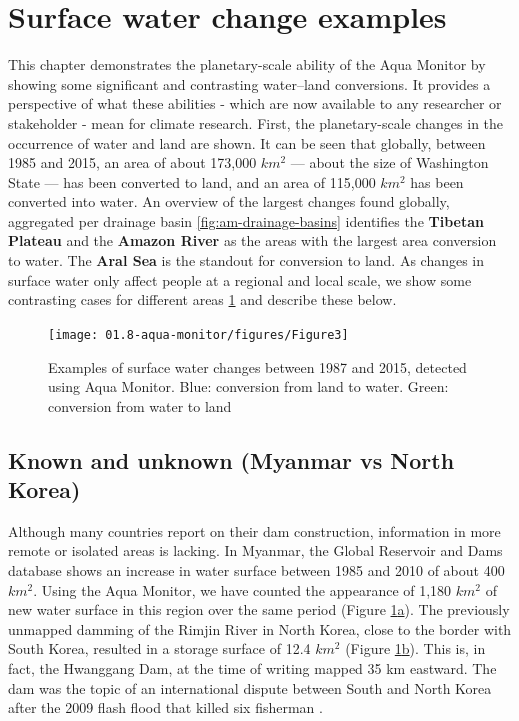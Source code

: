 \section{Surface water change examples}

This chapter demonstrates the planetary-scale ability of the Aqua Monitor by showing some significant and contrasting water–land conversions. It provides a perspective of what these abilities - which are now available to any researcher or stakeholder - mean for climate research. First, the planetary-scale changes in the occurrence of water and land are shown. It can be seen that globally, between 1985 and 2015, an area of about 173,000 $km^2$ — about the size of Washington State — has been converted to land, and an area of 115,000 $km^2$ has been converted into water. An overview of the largest changes found globally, aggregated per drainage basin \ref{fig:am-drainage-basins} identifies the \textbf{Tibetan Plateau} and the \textbf{Amazon River} as the areas with the largest area conversion to water. The \textbf{Aral Sea} is the standout for conversion to land. As changes in surface water only affect people at a regional and local scale, we show some contrasting cases for different areas \ref{fig:am-examples} and describe these below.

\begin{figure}[H]
	\centering
	\texttt{[image: 01.8-aqua-monitor/figures/Figure3]}
	\caption{Examples of surface water changes between 1987 and 2015, detected using Aqua Monitor. Blue: conversion from land to water. Green: conversion from water to land}
	\label{fig:am-examples}
\end{figure}

\subsection{Known and unknown (Myanmar vs North Korea)}
Although many countries report on their dam construction, information in more remote or isolated areas is lacking. In Myanmar, the Global Reservoir and Dams database \citep{Lehner2011} shows an increase in water surface between 1985 and 2010 of about 400 $km^2$. Using the Aqua Monitor, we have counted the appearance of 1,180 $km^2$ of new water surface in this region over the same period (Figure \hyperref[fig:am-examples]{\ref{fig:am-examples}a}). The previously unmapped damming of the Rimjin River in North Korea, close to the border with South Korea, resulted in a storage surface of 12.4 $km^2$ (Figure \hyperref[fig:am-examples]{\ref{fig:am-examples}b}). This is, in fact, the Hwanggang Dam, at the time of writing mapped 35 km eastward. The dam was the topic of an international dispute between South and North Korea after the 2009 flash flood that killed six fisherman \citep{SangHun2009}.

